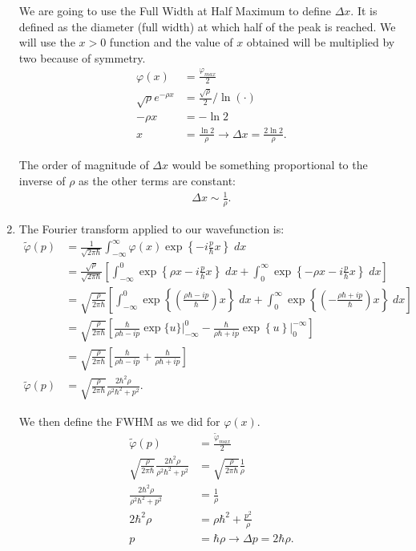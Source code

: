 \documentclass[letterpaper,11pt,twoside]{article}
\begin{document}
\begin{enumerate}[itemsep=0pt,topsep=0pt,label=(\alph*)]
  We are going to use the Full Width at Half Maximum to define $\Delta x$. It is defined as the diameter (full width) at which 
  half of the peak is reached. We will use the $x>0$ function and the value of $x$ obtained will be multiplied by two because of symmetry.
  \begin{align*}
    \varphi(x)&=\frac{\varphi_{max}}{2}\\
    \sqrt{\rho}e^{-\rho x}&=\frac{\sqrt{\rho}}{2}\biggr/\ln(\cdot)\\
    -\rho x&=-\ln2\\
    x&=\frac{\ln2}{\rho}\longrightarrow \Delta x=\frac{2\ln2}{\rho}.
  \end{align*}

  The order of magnitude of $\Delta x$ would be something proportional to the inverse of $\rho$ as the other terms are constant:
  \begin{align*}
    \Delta x\sim\frac{1}{\rho}.
  \end{align*}

  \item The Fourier transform applied to our wavefunction is:
  \begin{align*}
    \tilde{\varphi}(p)&=\frac{1}{\sqrt{2\pi\hbar}}\int_{-\infty}^\infty \varphi(x)\exp\left\{-i\frac{p}{\hbar}x\right\}\;dx\\
    &=\frac{\sqrt{\rho}}{\sqrt{2\pi\hbar}}\left[\int_{-\infty}^0\exp\left\{\rho x-i\frac{p}{\hbar}x\right\}\;dx+\int_0^\infty \exp\left\{-\rho x-i\frac{p}{\hbar}x\right\}\;dx\right]\\
    &=\sqrt{\frac{\rho}{2\pi\hbar}}\left[\int_{-\infty}^0\exp\left\{\left(\frac{\rho\hbar-ip}{\hbar}\right)x\right\}\;dx+\int_0^\infty \exp\left\{\left(-\frac{\rho\hbar+ip}{\hbar}\right)x\right\}\;dx\right]\\
    &=\sqrt{\frac{\rho}{2\pi\hbar}}\left[\frac{\hbar}{\rho\hbar-ip}\exp\{u\}\biggr|_{-\infty}^0-\frac{\hbar}{\rho\hbar+ip}\exp\left\{u\right\}\biggr|_0^{-\infty}\right]\\
    &=\sqrt{\frac{\rho}{2\pi\hbar}}\left[\frac{\hbar}{\rho\hbar-ip}+\frac{\hbar}{\rho\hbar+ip}\right]\\
    \tilde{\varphi}(p)&=\sqrt{\frac{\rho}{2\pi\hbar}}\frac{2\hbar^2\rho}{\rho^2\hbar^2+p^2}.
  \end{align*}

  We then define the FWHM as we did for $\varphi(x)$.
  \begin{align*}
    \tilde{\varphi}(p)&=\frac{\tilde{\varphi}_{max}}{2}\\
    \sqrt{\frac{\rho}{2\pi\hbar}}\frac{2\hbar^2\rho}{\rho^2\hbar^2+p^2}&=\sqrt{\frac{\rho}{2\pi\hbar}}\frac{1}{\rho}\\
    \frac{2\hbar^2\rho}{\rho^2\hbar^2+p^2}&=\frac{1}{\rho}\\
    2\hbar^2\rho&=\rho\hbar^2+\frac{p^2}{\rho}\\
    p&=\hbar\rho\longrightarrow\Delta p=2\hbar\rho.
  \end{align*}


\end{enumerate}
\end{document}
